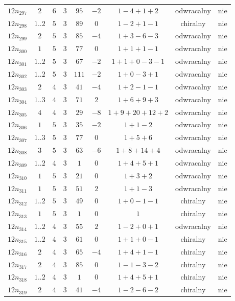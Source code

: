 \begin{longtable}{ccccccccc}
$12n_{297}$ & $2$ & $6$ & $3$ & $95$ & $-2$ & $1-4+1+2$ & odwracalny & nie \\
$12n_{298}$ & $1..2$ & $5$ & $3$ & $89$ & $0$ & $1-2+1-1$ & chiralny & nie \\
$12n_{299}$ & $2$ & $5$ & $3$ & $85$ & $-4$ & $1+3-6-3$ & odwracalny & nie \\
$12n_{300}$ & $1$ & $5$ & $3$ & $77$ & $0$ & $1+1+1-1$ & odwracalny & nie \\
$12n_{301}$ & $1..2$ & $5$ & $3$ & $67$ & $-2$ & $1+1+0-3-1$ & odwracalny & nie \\
$12n_{302}$ & $1..2$ & $5$ & $3$ & $111$ & $-2$ & $1+0-3+1$ & odwracalny & nie \\
$12n_{303}$ & $2$ & $4$ & $3$ & $41$ & $-4$ & $1+2-1-1$ & odwracalny & nie \\
$12n_{304}$ & $1..3$ & $4$ & $3$ & $71$ & $2$ & $1+6+9+3$ & odwracalny & nie \\
$12n_{305}$ & $4$ & $4$ & $3$ & $29$ & $-8$ & $1+9+20+12+2$ & odwracalny & nie \\
$12n_{306}$ & $1$ & $5$ & $3$ & $35$ & $-2$ & $1+1-2$ & odwracalny & nie \\
$12n_{307}$ & $1..3$ & $5$ & $3$ & $77$ & $0$ & $1+5+6$ & odwracalny & nie \\
$12n_{308}$ & $3$ & $5$ & $3$ & $63$ & $-6$ & $1+8+14+4$ & odwracalny & nie \\
$12n_{309}$ & $1..2$ & $4$ & $3$ & $1$ & $0$ & $1+4+5+1$ & odwracalny & nie \\
$12n_{310}$ & $1$ & $5$ & $3$ & $21$ & $0$ & $1+3+2$ & odwracalny & nie \\
$12n_{311}$ & $1$ & $5$ & $3$ & $51$ & $2$ & $1+1-3$ & odwracalny & nie \\
$12n_{312}$ & $1..2$ & $5$ & $3$ & $49$ & $0$ & $1+0-1-1$ & chiralny & nie \\
$12n_{313}$ & $1$ & $5$ & $3$ & $1$ & $0$ & $1$ & chiralny & nie \\
$12n_{314}$ & $1..2$ & $4$ & $3$ & $55$ & $2$ & $1-2+0+1$ & odwracalny & nie \\
$12n_{315}$ & $1..2$ & $4$ & $3$ & $61$ & $0$ & $1+1+0-1$ & chiralny & nie \\
$12n_{316}$ & $2$ & $4$ & $3$ & $65$ & $-4$ & $1+4+1-1$ & chiralny & nie \\
$12n_{317}$ & $2$ & $4$ & $3$ & $85$ & $0$ & $1-1-3-2$ & chiralny & nie \\
$12n_{318}$ & $1..2$ & $4$ & $3$ & $1$ & $0$ & $1+4+5+1$ & chiralny & nie \\
$12n_{319}$ & $2$ & $4$ & $3$ & $41$ & $-4$ & $1-2-6-2$ & chiralny & nie \\

\end{longtable}
